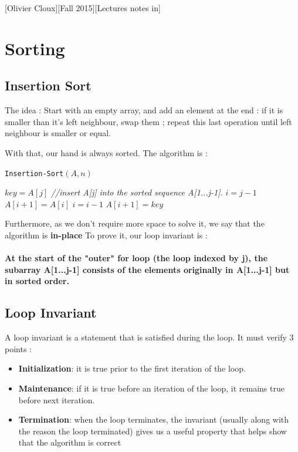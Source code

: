 \documentclass[12pt,twoside,a4paper]{article}
\begin{document}
[Olivier Cloux][Fall 2015][Lectures notes in]	%
\tableofcontents
{}
\section{Sorting}
\subsection{Insertion Sort}
The idea : Start with an empty array, and add an element at the end : if it is smaller than it's left neighbour, swap them ; repeat this last operation until left neighbour is smaller or equal.

With that, our hand is always sorted. The algorithm is :
\begin{algorithm}
	\caption{\texttt{Insertion-Sort}$(A,n)$}
	\begin{algorithmic}
			\STATE $key = A[j]$
			\STATE \textit{//insert A[j] into the sorted sequence A[1...j-1].}
			\STATE $i = j-1$
				\STATE $A[i+1] = A[i]$
				\STATE $i = i-1$
			\ENDWHILE
			\STATE $A[i+1] = key$
		\ENDFOR
	\end{algorithmic}
\end{algorithm}
Furthermore, as we don't require more space to solve it, we say that the algorithm is \textbf{in-place}
To prove it, our loop invariant is : \paragraph{At the start of the "outer" for loop (the loop indexed by j), the subarray A[1...j-1] consists of the elements originally in A[1...j-1] but in sorted order.}
\subsection{Loop Invariant}
A loop invariant is a statement that is satisfied during the loop. It must verify 3 points :
\begin{itemize}
	\item 	\textbf{Initialization}: it is true prior to the first iteration of the loop.
	\item 	\textbf{Maintenance}: if it is true before an iteration of the loop, it remains true before next iteration.
	\item 	\textbf{Termination}: when the loop terminates, the invariant (usually along with the reason the loop terminated) gives us a useful property that helps show that the algorithm is correct
\end{itemize}
\end{document}
